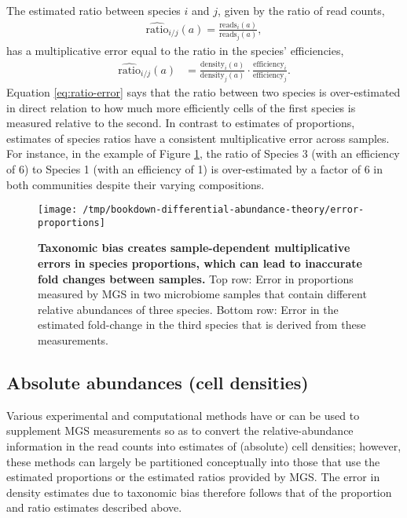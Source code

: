 \documentclass[
]{article}
\theoremstyle{definition}
\theoremstyle{definition}
\theoremstyle{definition}
\theoremstyle{definition}
\theoremstyle{remark}
\begin{document}
The estimated ratio between species \(i\) and \(j\), given by the ratio of read counts,
\begin{align*}
  \hat{\text{ratio}}_{i/j}(a) = \frac{\text{reads}_i(a)}{\text{reads}_j(a)},
\end{align*}
has a multiplicative error equal to the ratio in the species' efficiencies,
\begin{align}
  \label{eq:ratio-error}
  \hat{\text{ratio}}_{i/j}(a)
  &= \frac{\text{density}_{i}(a)}{\text{density}_{j}(a)} \cdot \frac{\text{efficiency}_{i}}{\text{efficiency}_{j}}.
\end{align}
Equation \eqref{eq:ratio-error} says that the ratio between two species is over-estimated in direct relation to how much more efficiently cells of the first species is measured relative to the second.
In contrast to estimates of proportions, estimates of species ratios have a consistent multiplicative error across samples.
For instance, in the example of Figure \ref{fig:error-proportions}, the ratio of Species 3 (with an efficiency of 6) to Species 1 (with an efficiency of 1) is over-estimated by a factor of 6 in both communities despite their varying compositions.

\begin{figure}
\texttt{[image: /tmp/bookdown-differential-abundance-theory/error-proportions]} \caption{\textbf{Taxonomic bias creates sample-dependent multiplicative errors in species proportions, which can lead to inaccurate fold changes between samples.} Top row: Error in proportions measured by MGS in two microbiome samples that contain different relative abundances of three species. Bottom row: Error in the estimated fold-change in the third species that is derived from these measurements.}\label{fig:error-proportions}
\end{figure}



\hypertarget{absolute-abundances-cell-densities}{%
\subsection{Absolute abundances (cell densities)}\label{absolute-abundances-cell-densities}}

Various experimental and computational methods have or can be used to supplement MGS measurements so as to convert the relative-abundance information in the read counts into estimates of (absolute) cell densities;
however, these methods can largely be partitioned conceptually into those that use the estimated proportions or the estimated ratios provided by MGS.
The error in density estimates due to taxonomic bias therefore follows that of the proportion and ratio estimates described above.
\end{document}
